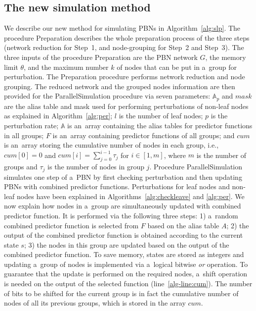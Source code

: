 \documentclass[runningheads,a4paper]{llncs}
\begin{document}
\subsection{The new simulation method}
\label{ssec:method}
We describe our new method for simulating PBNs in Algorithm~\ref{alg:slp}.
The procedure {\sc Preparation} describes the whole preparation process of the three steps
(network reduction for Step~1, and node-grouping for Step~2 and Step~3). The three inputs of the
procedure {\sc Preparation} are the PBN network $G$, the memory limit $\theta$, and the maximum
number $k$ of nodes that can be put in a~group for perturbation.
The {\sc Preparation} procedure
performs network reduction and node grouping.
The reduced network and the grouped nodes information are then provided
for the {\sc ParallelSimulation} procedure via seven parameters:	
$\mathbb{A}_p$ and $mask$ are the alias table and mask used for performing perturbations of
non-leaf nodes as explained in Algorithm~\ref{alg:per}; $l$ is the number of leaf nodes;
$p$ is the perturbation rate;
$\mathbb{A}$ is an~array containing the alias tables for predictor functions in all groups;
$F$ is an~array containing predictor functions of all groups;
and $cum$ is an~array storing the cumulative number of nodes in each group,
i.e., $cum[0]=0$ and $cum[i]=\sum_{j=0}^{i-1}\tau_j$ for $i\in [1,m]$, where $m$ is the number of groups and $\tau_j$ is the number of nodes in group $j$.
Procedure {\sc ParallelSimulation} simulates one step of a~PBN by first checking perturbation
and then updating PBNs with combined predictor functions.
Perturbations for leaf nodes and non-leaf nodes have been explained in
Algorithms~\ref{alg:checkleave} and \ref{alg:per}.
We now explain how nodes in a~group are simultaneously updated with combined predictor function.
It is performed via the following three steps:
 1) a~random combined predictor function is selected from $F$ based on the alias table $A$;
 2) the output of the combined predictor function is obtained according to the current state $s$;
 3) the nodes in this group are updated based on the output of the combined predictor function.
To save memory, states are stored as integers and updating a~group of nodes is implemented via
a~logical bitwise \textit{or} operation. To guarantee that the update is performed on the required
nodes, a~shift operation is needed on the output of the selected function (line~\ref{alg-line:cum}).
The number of bits to be shifted for the current group is in fact the cumulative number of nodes of all its previous groups,
which is stored in the array $cum$.
\end{document}

